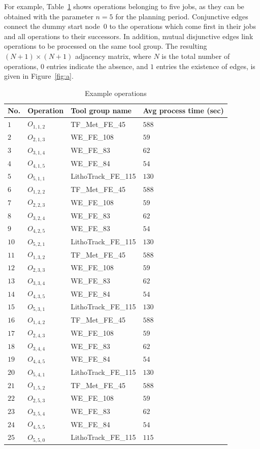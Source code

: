 \documentclass[runningheads]{llncs}
\begin{document}
For example, Table~\ref{tab:operations} shows operations
belonging to five jobs, as they can
be obtained with the parameter $n=5$ for the planning period.
Conjunctive edges connect the dummy start node~$0$ to
the operations which come first in their jobs and all operations to their successors.
In addition, mutual disjunctive edges link operations
to be processed on the same tool group.
The resulting $(N+1)\times(N+1)$ adjacency matrix, where $N$ is the
total number of operations, $0$ entries indicate the absence, and
$1$ entries the existence of edges, is given in Figure~\ref{fig:a}.

\begin{table}[t]
	\caption{Example operations}\label{tab:operations} \centering
	\begin{tabular}{|l|l|l|l|}
		\hline
		No. & Operation & Tool group name & Avg process time (sec)\\ \hline
		$1$ & $O_{1,1,2}$ & TF\_Met\_FE\_45 & $588$ \\
		$2$ & $O_{2,1,3}$ & WE\_FE\_108 & $59$ \\
		$3$ & $O_{3,1,4}$ & WE\_FE\_83 & $62$ \\
		$4$ & $O_{4,1,5}$ & WE\_FE\_84 & $54$ \\
		$5$ & $O_{5,1,1}$ & LithoTrack\_FE\_115 & $130$ \\
		$6$ & $O_{1,2,2}$ & TF\_Met\_FE\_45    & $588$ \\
		$7$ & $O_{2,2,3}$ & WE\_FE\_108 & $59$ \\
		$8$ & $O_{3,2,4}$ & WE\_FE\_83         & $62$ \\
		$9$ & $O_{4,2,5}$ & WE\_FE\_83    & $54$ \\
		$10$ & $O_{5,2,1}$ & LithoTrack\_FE\_115 & $130$ \\
		$11$ & $O_{1,3,2}$ & TF\_Met\_FE\_45         & $588$ \\
		$12$ & $O_{2,3,3}$ & WE\_FE\_108    & $59$ \\
		$13$ & $O_{3,3,4}$ & WE\_FE\_83 & $62$ \\
		$14$ & $O_{4,3,5}$ & WE\_FE\_84         & $54$ \\
		$15$ & $O_{5,3,1}$ & LithoTrack\_FE\_115    & $130$ \\
		$16$ & $O_{1,4,2}$ & TF\_Met\_FE\_45 & $588$ \\
		$17$ & $O_{2,4,3}$ & WE\_FE\_108         & $59$ \\
		$18$ & $O_{3,4,4}$ & WE\_FE\_83    & $62$ \\
		$19$ & $O_{4,4,5}$ & WE\_FE\_84 & $54$ \\
		$20$ & $O_{5,4,1}$ & LithoTrack\_FE\_115         & $130$ \\
		$21$ & $O_{1,5,2}$ & TF\_Met\_FE\_45   & $588$ \\
		$22$ & $O_{2,5,3}$ & WE\_FE\_108 & $59$ \\
		$23$ & $O_{3,5,4}$ & WE\_FE\_83         & $62$ \\
		$24$ & $O_{4,5,5}$ & WE\_FE\_84    & $54$ \\
		$25$ & $O_{5,5,0}$ & LithoTrack\_FE\_115 & $115$ \\
		\hline
	\end{tabular}
\end{table}
\end{document}
